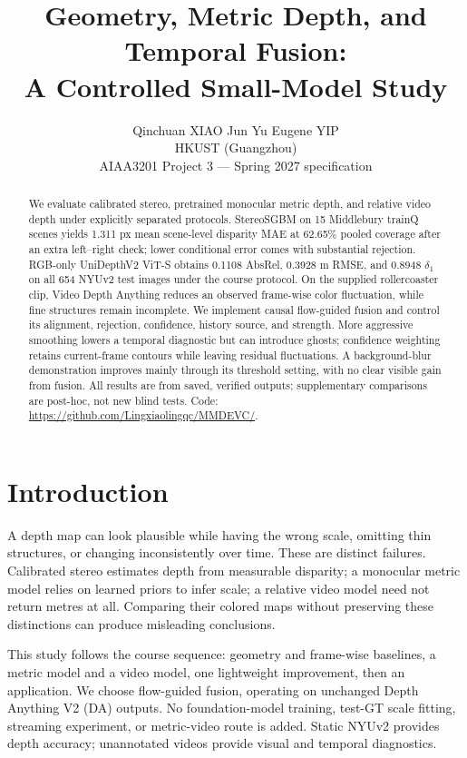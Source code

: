 \documentclass[10pt,twocolumn,letterpaper]{article}
\title{Geometry, Metric Depth, and Temporal Fusion:\\A Controlled Small-Model Study}
\author{Qinchuan XIAO \qquad Jun Yu Eugene YIP\\
HKUST (Guangzhou)\\
AIAA3201 Project 3 --- Spring 2027 specification}
\begin{document}
\maketitle
\begin{abstract}
We evaluate calibrated stereo, pretrained monocular metric depth, and relative video depth under explicitly separated protocols. StereoSGBM on 15 Middlebury trainQ scenes yields 1.311 px mean scene-level disparity MAE at 62.65\% pooled coverage after an extra left--right check; lower conditional error comes with substantial rejection. RGB-only UniDepthV2 ViT-S obtains 0.1108 AbsRel, 0.3928 m RMSE, and 0.8948 $\delta_1$ on all 654 NYUv2 test images under the course protocol. On the supplied rollercoaster clip, Video Depth Anything reduces an observed frame-wise color fluctuation, while fine structures remain incomplete. We implement causal flow-guided fusion and control its alignment, rejection, confidence, history source, and strength. More aggressive smoothing lowers a temporal diagnostic but can introduce ghosts; confidence weighting retains current-frame contours while leaving residual fluctuations. A background-blur demonstration improves mainly through its threshold setting, with no clear visible gain from fusion. All results are from saved, verified outputs; supplementary comparisons are post-hoc, not new blind tests. Code: \url{https://github.com/Lingxiaolingqc/MMDEVC/}.
\end{abstract}

\section{Introduction}
A depth map can look plausible while having the wrong scale, omitting thin structures, or changing inconsistently over time. These are distinct failures. Calibrated stereo estimates depth from measurable disparity; a monocular metric model relies on learned priors to infer scale; a relative video model need not return metres at all. Comparing their colored maps without preserving these distinctions can produce misleading conclusions.

This study follows the course sequence: geometry and frame-wise baselines, a metric model and a video model, one lightweight improvement, then an application. We choose flow-guided fusion, operating on unchanged Depth Anything V2 (DA) outputs. No foundation-model training, test-GT scale fitting, streaming experiment, or metric-video route is added. Static NYUv2 provides depth accuracy; unannotated videos provide visual and temporal diagnostics.
\end{document}
